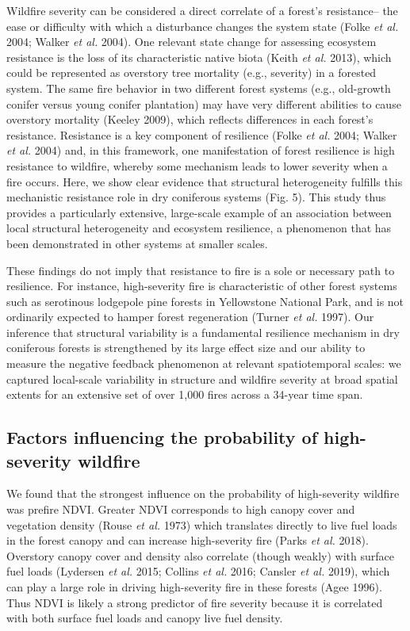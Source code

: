 \documentclass[]{article}
\begin{document}
Wildfire severity can be considered a direct correlate of a forest's
resistance-- the ease or difficulty with which a disturbance changes the
system state (Folke \emph{et al.} 2004; Walker \emph{et al.} 2004). One
relevant state change for assessing ecosystem resistance is the loss of
its characteristic native biota (Keith \emph{et al.} 2013), which could
be represented as overstory tree mortality (e.g., severity) in a
forested system. The same fire behavior in two different forest systems
(e.g., old-growth conifer versus young conifer plantation) may have very
different abilities to cause overstory mortality (Keeley 2009), which
reflects differences in each forest's resistance. Resistance is a key
component of resilience (Folke \emph{et al.} 2004; Walker \emph{et al.}
2004) and, in this framework, one manifestation of forest resilience is
high resistance to wildfire, whereby some mechanism leads to lower
severity when a fire occurs. Here, we show clear evidence that
structural heterogeneity fulfills this mechanistic resistance role in
dry coniferous systems (Fig. 5). This study thus provides a particularly
extensive, large-scale example of an association between local
structural heterogeneity and ecosystem resilience, a phenomenon that has
been demonstrated in other systems at smaller scales.

These findings do not imply that resistance to fire is a sole or
necessary path to resilience. For instance, high-severity fire is
characteristic of other forest systems such as serotinous lodgepole pine
forests in Yellowstone National Park, and is not ordinarily expected to
hamper forest regeneration (Turner \emph{et al.} 1997). Our inference
that structural variability is a fundamental resilience mechanism in dry
coniferous forests is strengthened by its large effect size and our
ability to measure the negative feedback phenomenon at relevant
spatiotemporal scales: we captured local-scale variability in structure
and wildfire severity at broad spatial extents for an extensive set of
over 1,000 fires across a 34-year time span.

\hypertarget{factors-influencing-the-probability-of-high-severity-wildfire}{%
\subsection{Factors influencing the probability of high-severity
wildfire}\label{factors-influencing-the-probability-of-high-severity-wildfire}}

We found that the strongest influence on the probability of
high-severity wildfire was prefire NDVI. Greater NDVI corresponds to
high canopy cover and vegetation density (Rouse \emph{et al.} 1973)
which translates directly to live fuel loads in the forest canopy and
can increase high-severity fire (Parks \emph{et al.} 2018). Overstory
canopy cover and density also correlate (though weakly) with surface
fuel loads (Lydersen \emph{et al.} 2015; Collins \emph{et al.} 2016;
Cansler \emph{et al.} 2019), which can play a large role in driving
high-severity fire in these forests (Agee 1996). Thus NDVI is likely a
strong predictor of fire severity because it is correlated with both
surface fuel loads and canopy live fuel density.
\end{document}

